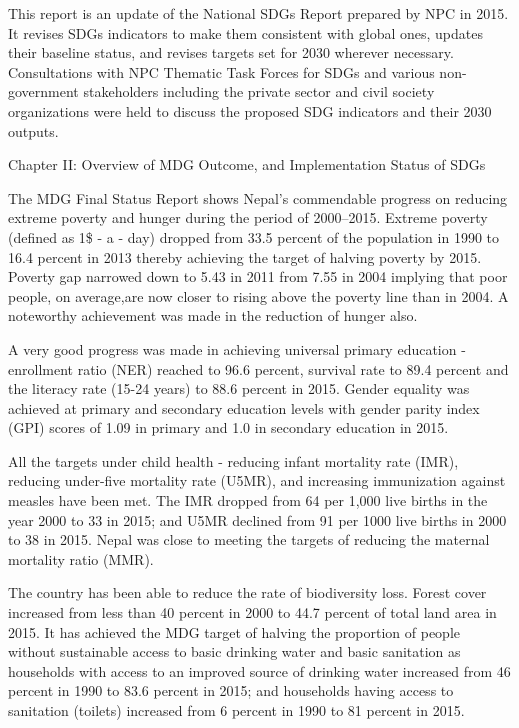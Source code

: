 \documentclass[
  openany]{book}
\begin{document}
This report is an update of the National SDGs Report prepared by NPC in 2015. It revises SDGs indicators to make them consistent with global ones, updates their baseline status, and revises targets set for 2030 wherever necessary. Consultations with NPC Thematic Task Forces for SDGs and various non-government stakeholders including the private sector and civil society organizations were held to discuss the proposed SDG indicators and their 2030 outputs.

Chapter II: Overview of MDG Outcome, and Implementation Status of SDGs

The MDG Final Status Report shows Nepal's commendable progress on reducing extreme poverty and hunger during the period of 2000--2015. Extreme poverty (defined as 1\$ - a - day) dropped from 33.5 percent of the population in 1990 to 16.4 percent in 2013 thereby achieving the target of halving poverty by 2015. Poverty gap narrowed down to 5.43 in 2011 from 7.55 in 2004 implying that poor people, on average,are now closer to rising above the poverty line than in 2004. A noteworthy achievement was made in the reduction of hunger also.

A very good progress was made in achieving universal primary education - enrollment ratio (NER) reached to 96.6 percent, survival rate to 89.4 percent and the literacy rate (15-24 years) to 88.6 percent in 2015. Gender equality was achieved at primary and secondary education levels with gender parity index (GPI) scores of 1.09 in primary and 1.0 in secondary education in 2015.

All the targets under child health - reducing infant mortality rate (IMR), reducing under-five mortality rate (U5MR), and increasing immunization against measles have been met. The IMR dropped from 64 per 1,000 live births in the year 2000 to 33 in 2015; and U5MR declined from 91 per 1000 live births in 2000 to 38 in 2015. Nepal was close to meeting the targets of reducing the maternal mortality ratio (MMR).

The country has been able to reduce the rate of biodiversity loss. Forest cover increased from less than 40 percent in 2000 to 44.7 percent of total land area in 2015. It has achieved the MDG target of halving the proportion of people without sustainable access to basic drinking water and basic sanitation as households with access to an improved source of drinking water increased from 46 percent in 1990 to 83.6 percent in 2015; and households having access to sanitation (toilets) increased from 6 percent in 1990 to 81 percent in 2015.
\end{document}
